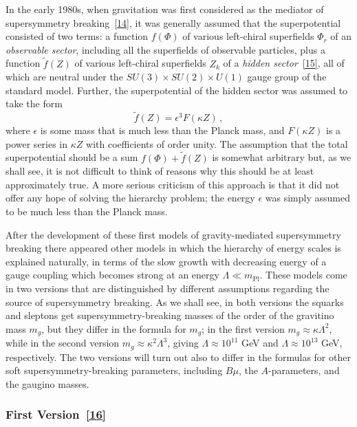 In the early 1980s, when gravitation was first considered as the mediator of
supersymmetry breaking~\hyperref[ch31-ref-14]{[14]}, it was generally assumed
that the superpotential consisted of two terms: a function \(f(\Phi)\) of
various left-chiral superfields \(\Phi_r\) of an \emph{observable sector},
including all the superfields of observable particles, plus a function
\(\widetilde f(Z)\) of various left-chiral superfields \(Z_k\) of a
\emph{hidden sector}~\hyperref[ch31-ref-15]{[15]}, all of which are neutral
under the \(SU(3)\times SU(2)\times U(1)\) gauge group of the standard model.
Further, the superpotential of the hidden sector was assumed to take the
form
\begin{equation}
  \widetilde f(Z)=\epsilon^3 F(\kappa Z)\,,
  \tag{31.7.1}\label{eq:31.7.1}
\end{equation}
where \(\epsilon\) is some mass that is much less than the Planck mass, and
\(F(\kappa Z)\) is a power series in \(\kappa Z\) with coefficients of order
unity. The assumption that the total superpotential should be a sum
\(f(\Phi)+\widetilde f(Z)\) is somewhat arbitrary but, as we shall see, it is
not difficult to think of reasons why this should be at least approximately
true. A more serious criticism of this approach is that it did not offer any
hope of solving the hierarchy problem; the energy \(\epsilon\) was simply
assumed to be much less than the Planck mass.

After the development of these first models of gravity-mediated
supersymmetry breaking there appeared other models in which the hierarchy
of energy scales is explained naturally, in terms of the slow growth with
decreasing energy of a gauge coupling which becomes strong at an energy
\(\Lambda\ll m_{\mathrm{Pl}}\). These models come in two versions that are
distinguished by different assumptions regarding the source of
supersymmetry breaking. As we shall see, in both versions the squarks and
sleptons get supersymmetry-breaking masses of the order of the gravitino
mass \(m_g\), but they differ in the formula for \(m_g\); in the first
version \(m_g\approx\kappa\Lambda^2\), while in the second version
\(m_g\approx\kappa^2\Lambda^3\), giving \(\Lambda\approx10^{11}\) GeV and
\(\Lambda\approx10^{13}\) GeV, respectively. The two versions will turn out
also to differ in the formulas for other soft supersymmetry-breaking
parameters, including \(B\mu\), the \(A\)-parameters, and the gaugino
masses.

\subsubsection*{First Version~\hyperref[ch31-ref-16]{[16]}}

